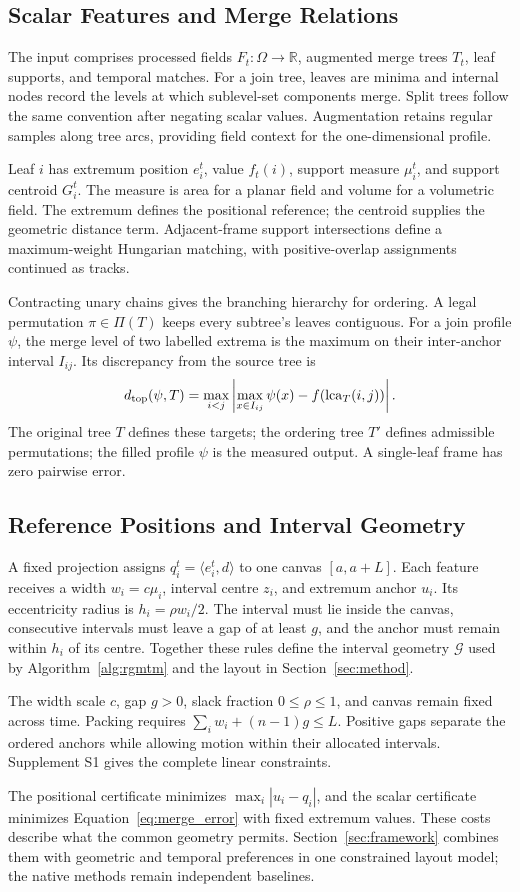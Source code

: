 \subsection{Scalar Features and Merge Relations}
The input comprises processed fields $F_t:\Omega\rightarrow\mathbb R$, augmented merge trees $T_t$, leaf supports, and temporal matches. For a join tree, leaves are minima and internal nodes record the levels at which sublevel-set components merge. Split trees follow the same convention after negating scalar values. Augmentation retains regular samples along tree arcs, providing field context for the one-dimensional profile.

Leaf $i$ has extremum position $e_i^t$, value $f_t(i)$, support measure $\mu_i^t$, and support centroid $G_i^t$. The measure is area for a planar field and volume for a volumetric field. The extremum defines the positional reference; the centroid supplies the geometric distance term. Adjacent-frame support intersections define a maximum-weight Hungarian matching, with positive-overlap assignments continued as tracks.

Contracting unary chains gives the branching hierarchy for ordering. A legal permutation $\pi\in\Pi(T)$ keeps every subtree's leaves contiguous. For a join profile $\psi$, the merge level of two labelled extrema is the maximum on their inter-anchor interval $I_{ij}$. Its discrepancy from the source tree is
\begin{equation}
 d_{\rm top}(\psi,T)=\max_{i<j}\left|\max_{x\in I_{ij}}\psi(x)-f(\operatorname{lca}_T(i,j))\right|.
 \label{eq:merge_error}
\end{equation}
The original tree $T$ defines these targets; the ordering tree $T'$ defines admissible permutations; the filled profile $\psi$ is the measured output. A single-leaf frame has zero pairwise error.

\subsection{Reference Positions and Interval Geometry}
A fixed projection assigns $q_i^t=\langle e_i^t,d\rangle$ to one canvas $[a,a+L]$. Each feature receives a width $w_i=c\mu_i$, interval centre $z_i$, and extremum anchor $u_i$. Its eccentricity radius is $h_i=\rho w_i/2$. The interval must lie inside the canvas, consecutive intervals must leave a gap of at least $g$, and the anchor must remain within $h_i$ of its centre. Together these rules define the interval geometry $\mathcal G$ used by Algorithm~\ref{alg:rgmtm} and the layout in Section~\ref{sec:method}.

The width scale $c$, gap $g>0$, slack fraction $0\le\rho\le1$, and canvas remain fixed across time. Packing requires $\sum_iw_i+(n-1)g\le L$. Positive gaps separate the ordered anchors while allowing motion within their allocated intervals. Supplement S1 gives the complete linear constraints.

The positional certificate minimizes $\max_i|u_i-q_i|$, and the scalar certificate minimizes Equation~\eqref{eq:merge_error} with fixed extremum values. These costs describe what the common geometry permits. Section~\ref{sec:framework} combines them with geometric and temporal preferences in one constrained layout model; the native methods remain independent baselines.

